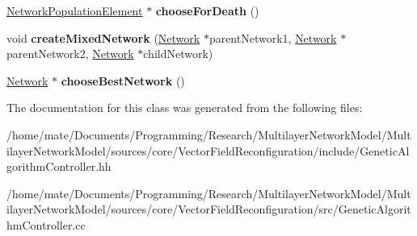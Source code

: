 \begin{DoxyCompactItemize}
\item 
\hyperlink{classNetworkPopulationElement}{Network\+Population\+Element} $\ast$ {\bfseries choose\+For\+Death} ()\hypertarget{classGeneticAlgorithmController_a350ec79a28d1d1009384eacf93bc0171}{}\label{classGeneticAlgorithmController_a350ec79a28d1d1009384eacf93bc0171}

\item 
void {\bfseries create\+Mixed\+Network} (\hyperlink{classNetwork}{Network} $\ast$parent\+Network1, \hyperlink{classNetwork}{Network} $\ast$parent\+Network2, \hyperlink{classNetwork}{Network} $\ast$child\+Network)\hypertarget{classGeneticAlgorithmController_a92ca74b0e18054383292745bb2f72f7b}{}\label{classGeneticAlgorithmController_a92ca74b0e18054383292745bb2f72f7b}

\item 
\hyperlink{classNetwork}{Network} $\ast$ {\bfseries choose\+Best\+Network} ()\hypertarget{classGeneticAlgorithmController_a334b1eaff6e53bf69336e8fb98d88bab}{}\label{classGeneticAlgorithmController_a334b1eaff6e53bf69336e8fb98d88bab}

\end{DoxyCompactItemize}


The documentation for this class was generated from the following files\+:\begin{DoxyCompactItemize}
\item 
/home/mate/\+Documents/\+Programming/\+Research/\+Multilayer\+Network\+Model/\+Multilayer\+Network\+Model/sources/core/\+Vector\+Field\+Reconfiguration/include/Genetic\+Algorithm\+Controller.\+hh\item 
/home/mate/\+Documents/\+Programming/\+Research/\+Multilayer\+Network\+Model/\+Multilayer\+Network\+Model/sources/core/\+Vector\+Field\+Reconfiguration/src/Genetic\+Algorithm\+Controller.\+cc\end{DoxyCompactItemize}
